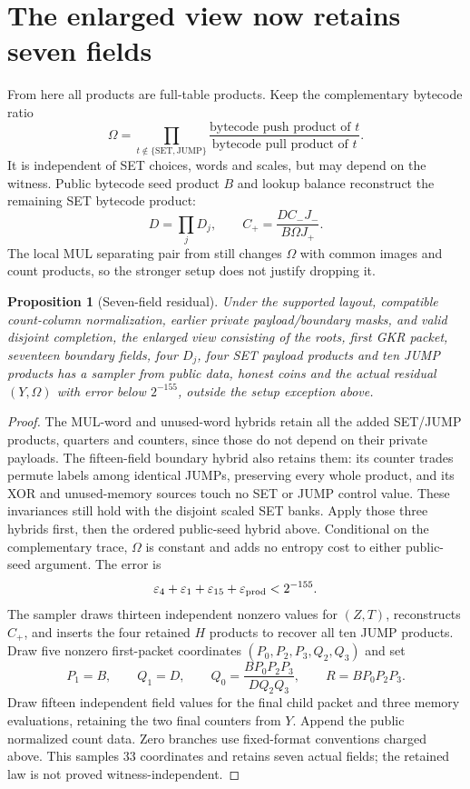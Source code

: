 \documentclass[11pt]{article}
\newtheorem{proposition}{Proposition}
\begin{document}
\section{The enlarged view now retains seven fields}

From here all products are full-table products. Keep the complementary bytecode ratio
\[
 \Omega=\prod_{t\notin\{\mathrm{SET},\mathrm{JUMP}\}}
 \frac{\text{bytecode push product of }t}{\text{bytecode pull product of }t}.
\]
It is independent of SET choices, words and scales, but may depend on the witness. Public bytecode seed product $B$ and lookup balance reconstruct the remaining SET bytecode product:
\[
 D=\prod_jD_j,\qquad C_+=\frac{D C_-J_-}{B\Omega J_+}.
\]
The local MUL separating pair from  still changes $\Omega$ with common images and count products, so the stronger setup does not justify dropping it.

\begin{proposition}[Seven-field residual]
Under the supported layout, compatible count-column normalization, earlier private payload/boundary masks, and valid disjoint completion, the enlarged view consisting of the roots, first GKR packet, seventeen boundary fields, four $D_j$, four SET payload products and ten JUMP products has a sampler from public data, honest coins and the actual residual $(Y,\Omega)$ with error below $2^{-155}$, outside the setup exception above.
\end{proposition}
\begin{proof}
The MUL-word and unused-word hybrids retain all the added SET/JUMP products, quarters and counters, since those do not depend on their private payloads. The fifteen-field boundary hybrid also retains them: its counter trades permute labels among identical JUMPs, preserving every whole product, and its XOR and unused-memory sources touch no SET or JUMP control value. These invariances still hold with the disjoint scaled SET banks. Apply those three hybrids first, then the ordered public-seed hybrid above. Conditional on the complementary trace, $\Omega$ is constant and adds no entropy cost to either public-seed argument. The error is
\[
 \varepsilon_4+\varepsilon_1+\varepsilon_{15}+\varepsilon_{\rm prod}<2^{-155}.
\]
The sampler draws thirteen independent nonzero values for $(Z,T)$, reconstructs $C_+$, and inserts the four retained $H$ products to recover all ten JUMP products. Draw five nonzero first-packet coordinates $(P_0,P_2,P_3,Q_2,Q_3)$ and set
\[
 P_1=B,\qquad Q_1=D,\qquad
 Q_0=\frac{BP_0P_2P_3}{DQ_2Q_3},\qquad R=BP_0P_2P_3.
\]
Draw fifteen independent field values for the final child packet and three memory evaluations, retaining the two final counters from $Y$. Append the public normalized count data. Zero branches use fixed-format conventions charged above. This samples $33$ coordinates and retains seven actual fields; the retained law is not proved witness-independent.
\end{proof}
\end{document}
